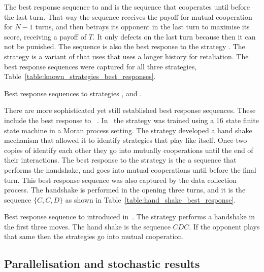 The best response sequence to \TitForTat and \Grudger is the sequence that
cooperates until before the last turn. That way the sequence receives the payoff
for mutual cooperation for \(N - 1\) turns, and then betrays its opponent in the
last turn to maximise its score, receiving a payoff of \(T\). It only defects
on the last turn because then it can not be punished. The sequence is also the
best response to the strategy \HardTitForTat. The strategy is a variant of
\TitForTat that uses that uses a longer history for retaliation. The best response
sequences were captured for all three strategies,
Table~\ref{table:known_strategies_best_responses}.

\begin{table}[!htbp]
    \resizebox{\textwidth}{!}{
    }
    \caption{Best response sequences to strategies \TitForTat, \Grudger
    and \HardTitForTat.}
    \label{table:known_strategies_best_responses}
\end{table}

There are more sophisticated yet still established best response sequences.
These include the best response to \TFOne~\cite{Knight2018}. In~\cite{Knight2018}
the strategy \TFOne was trained using a 16 state finite state machine in a Moran
process setting. The \TFOne strategy developed a hand shake mechanism that allowed
it to identify strategies that play like itself. Once two copies of \TFOne
identify each other they go into mutually cooperations until the end of their
interactions. The best response to the strategy is the a sequence that performs
the handshake, and goes into mutual cooperations until before the final turn.
This best response sequence was also captured by the data collection process.
The handshake is performed in the opening three turns, and it is the sequence
\(\{C, C, D\}\) as shown in Table~\ref{table:hand_shake_best_response}.

\begin{table}[!htbp]
    \resizebox{\textwidth}{!}{
    }
    \caption{Best response sequence to \TFOne introduced in~\cite{Knight2018}. The strategy
    performs a handshake in the first three moves. The hand shake is the sequence
    \(CDC\). If the opponent plays that same then the strategies go into mutual
    cooperation.}\label{table:hand_shake_best_response}
\end{table}

\subsection{Parallelisation and stochastic results}

